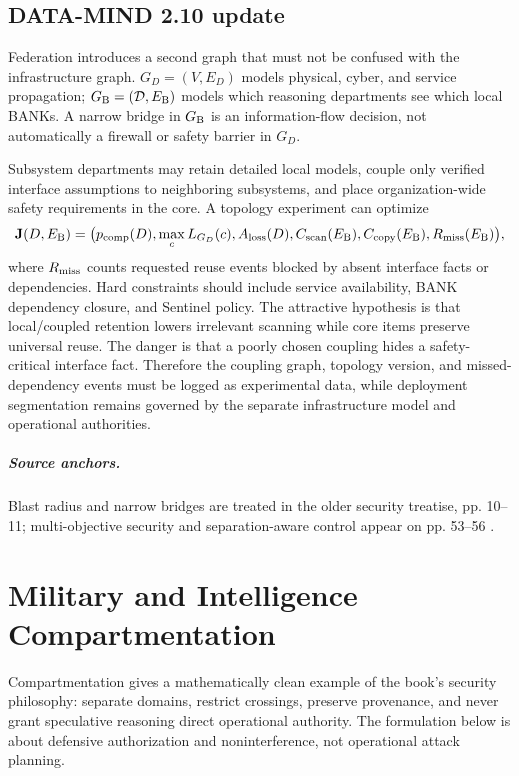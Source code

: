 \documentclass[11pt,oneside]{book}
\theoremstyle{definition}
\theoremstyle{remark}
\begin{document}
\section{DATA-MIND 2.10 update}
Federation introduces a second graph that must not be confused with the infrastructure graph.
\(G_D=(V,E_D)\) models physical, cyber, and service propagation; \(G_{\rm B}=(\mathcal D,E_{\rm B})\)
models which reasoning departments see which local BANKs. A narrow bridge in \(G_{\rm B}\) is an
information-flow decision, not automatically a firewall or safety barrier in \(G_D\).

Subsystem departments may retain detailed local models, couple only verified interface assumptions
to neighboring subsystems, and place organization-wide safety requirements in the core. A topology
experiment can optimize
\[
\mathbf J(D,E_{\rm B})=
\bigl(p_{\rm comp}(D),\max_cL_{G_D}(c),A_{\rm loss}(D),
C_{\rm scan}(E_{\rm B}),C_{\rm copy}(E_{\rm B}),R_{\rm miss}(E_{\rm B})\bigr),
\]
where \(R_{\rm miss}\) counts requested reuse events blocked by absent interface facts or dependencies.
Hard constraints should include service availability, BANK dependency closure, and Sentinel policy.
The attractive hypothesis is that local/coupled retention lowers irrelevant scanning while core items
preserve universal reuse. The danger is that a poorly chosen coupling hides a safety-critical interface
fact. Therefore the coupling graph, topology version, and missed-dependency events must be logged as
experimental data, while deployment segmentation remains governed by the separate infrastructure
model and operational authorities.

\paragraph{Source anchors.} Blast radius and narrow bridges are treated in the older security
treatise, pp. 10--11; multi-objective security and separation-aware control appear on pp. 53--56
\cite{TennesonSecurity}.

\chapter{Military and Intelligence Compartmentation}
\label{ch:compartmentation}

Compartmentation gives a mathematically clean example of the book's security philosophy: separate
domains, restrict crossings, preserve provenance, and never grant speculative reasoning direct
operational authority. The formulation below is about defensive authorization and noninterference,
not operational attack planning.
\end{document}
